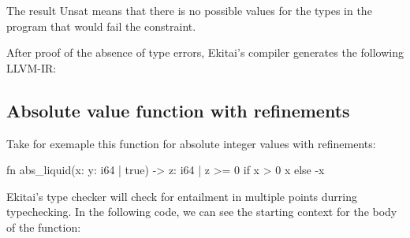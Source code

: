 \documentclass[
  oneside,
  english,
  coorientadorbanca,
  noabntexcite
]{ufsc-thesis-rn46-2019}
\newcommand{\code}[1]{\text{\scpfamily\setlength\spaceskip{0.35em}#1}}
\begin{document}
The result Unsat means that there is no possible values for the types in the program that would fail the constraint.

After proof of the absence of type errors, Ekitai's compiler generates the following LLVM-IR:


\subsection{Absolute value function with refinements}

Take for exemaple this function for absolute integer values with refinements:

\begin{rustcode}
fn abs_liquid(x: {y: i64 | true}) -> {z: i64 | z >= 0} {
  if x > 0 {
    x
  } else {
    -x
  }
}  
\end{rustcode}

Ekitai's type checker will check for entailment in multiple points durring typechecking.
In the following code, we can see the starting context for the body of the \code{abs\_liquid} function:
\end{document}
